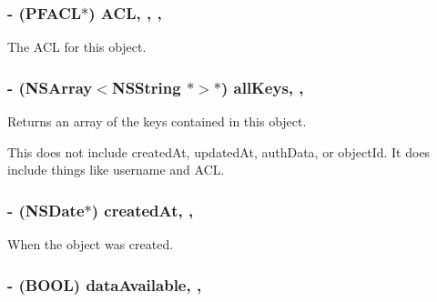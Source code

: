 \subsubsection[{A\+C\+L}]{\setlength{\rightskip}{0pt plus 5cm}-\/ ({\bf P\+F\+A\+C\+L}$\ast$) A\+C\+L\hspace{0.3cm}{\ttfamily [read]}, {\ttfamily [write]}, {\ttfamily [nonatomic]}, {\ttfamily [strong]}}\label{interface_p_f_object_ad09c7decbf32c9119852e30da0bf09a6}
The A\+C\+L for this object. \hypertarget{interface_p_f_object_a5d9d53b30dd97739a64765a618a16ec0}{}
\subsubsection[{all\+Keys}]{\setlength{\rightskip}{0pt plus 5cm}-\/ (N\+S\+Array$<$N\+S\+String $\ast$$>$$\ast$) all\+Keys\hspace{0.3cm}{\ttfamily [read]}, {\ttfamily [nonatomic]}, {\ttfamily [copy]}}\label{interface_p_f_object_a5d9d53b30dd97739a64765a618a16ec0}
Returns an array of the keys contained in this object.

This does not include {\ttfamily created\+At}, {\ttfamily updated\+At}, {\ttfamily auth\+Data}, or {\ttfamily object\+Id}. It does include things like username and A\+C\+L. \hypertarget{interface_p_f_object_ab9baa371bf6fc375e538dec6e95c4200}{}
\subsubsection[{created\+At}]{\setlength{\rightskip}{0pt plus 5cm}-\/ (N\+S\+Date$\ast$) created\+At\hspace{0.3cm}{\ttfamily [read]}, {\ttfamily [nonatomic]}, {\ttfamily [strong]}}\label{interface_p_f_object_ab9baa371bf6fc375e538dec6e95c4200}
When the object was created. \hypertarget{interface_p_f_object_a8a1d2d2912359f7daeabea3337f79d67}{}
\subsubsection[{data\+Available}]{\setlength{\rightskip}{0pt plus 5cm}-\/ (B\+O\+O\+L) data\+Available\hspace{0.3cm}{\ttfamily [read]}, {\ttfamily [nonatomic]}, {\ttfamily [assign]}}\label{interface_p_f_object_a8a1d2d2912359f7daeabea3337f79d67}




